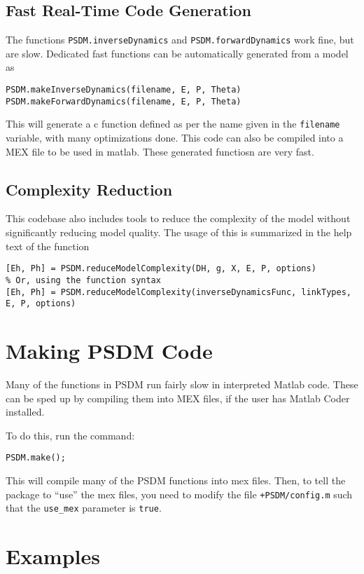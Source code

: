 \documentclass[12pt]{article}
\begin{document}
\subsection{Fast Real-Time Code Generation}
The functions \texttt{PSDM.inverseDynamics} and \texttt{PSDM.forwardDynamics} work fine, but are slow. Dedicated fast functions can be automatically generated from a model as
\begin{lstlisting}
PSDM.makeInverseDynamics(filename, E, P, Theta)
PSDM.makeForwardDynamics(filename, E, P, Theta)
\end{lstlisting}\vspace{1em}
This will generate a c function defined as per the name given in the \texttt{filename} variable, with many optimizations done. This code can also be compiled into a MEX file to be used in matlab. These generated functiosn are very fast.

\subsection{Complexity Reduction}
This codebase also includes tools to reduce the complexity of the model without significantly reducing model quality. The usage of this is summarized in the help text of the function
\begin{lstlisting}
[Eh, Ph] = PSDM.reduceModelComplexity(DH, g, X, E, P, options)
% Or, using the function syntax
[Eh, Ph] = PSDM.reduceModelComplexity(inverseDynamicsFunc, linkTypes, E, P, options)
\end{lstlisting}

\section{Making PSDM Code}

Many of the functions in PSDM run fairly slow in interpreted Matlab code. These can be sped up by compiling them into MEX files, if the user has Matlab Coder installed.

To do this, run the command:
\begin{lstlisting}
PSDM.make();
\end{lstlisting}

This will compile many of the PSDM functions into mex files. Then, to tell the package to ``use'' the mex files, you need to modify the file \texttt{+PSDM/config.m} such that the \texttt{use\_mex} parameter is \texttt{true}.

\section{Examples}
\end{document}
